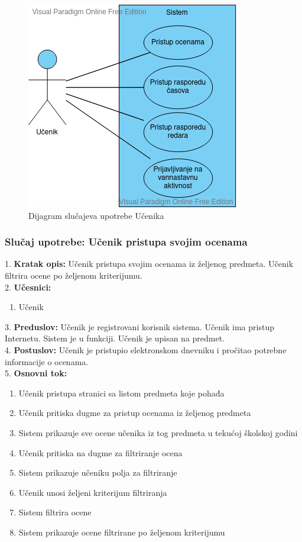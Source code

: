 \documentclass{article}
\begin{document}
\begin{figure} [!ht]
    \begin{center}
        \includegraphics[scale=0.6]{imgs/ucenik_use_case.png}
    \end{center}
\caption{Dijagram slučajeva upotrebe Učenika}
\end{figure}


\newpage
\subsubsection{Slučaj upotrebe: Učenik pristupa svojim ocenama} 
1. \textbf{Kratak opis:} Učenik pristupa svojim ocenama iz željenog predmeta. Učenik filtrira ocene po željenom kriterijumu. \\

2. \textbf{Učesnici:}
\begin{enumerate} [label=(\alph*)]
\item Učenik
\end{enumerate} 

3. \textbf{Preduslov:} Učenik je registrovani korisnik sistema. Učenik ima pristup Internetu. Sistem je u funkciji. Učenik je upisan na predmet. \\

4. \textbf{Postuslov:} Učenik je pristupio elektronskom dnevniku i pročitao potrebne informacije o ocenama.\\

5. \textbf{Osnovni tok:} 
\begin{enumerate} [label=(\alph*)]
\item Učenik pristupa stranici sa listom predmeta koje pohađa
\item Učenik pritiska dugme za pristup ocenama iz željenog predmeta
\item Sistem prikazuje sve ocene učenika iz tog predmeta u tekućoj školskoj godini
\item Učenik pritiska na dugme za filtriranje ocena
\item Sistem prikazuje učeniku polja za filtriranje
\item Učenik unosi željeni kriterijum filtriranja
\item Sistem filtrira ocene
\item Sistem prikazuje ocene filtrirane po željenom kriterijumu
\end{enumerate}
\end{document}
